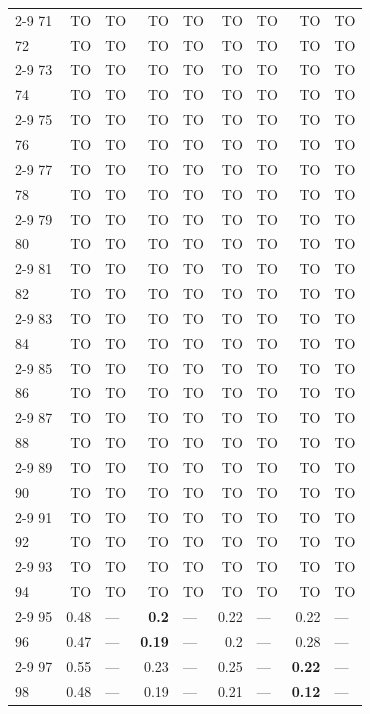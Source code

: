 \begin{longtable}{lr@{\hskip 4pt}l@{\hskip 12pt}r@{\hskip 4pt}l@{\hskip 12pt}r@{\hskip 4pt}l@{\hskip 12pt}r@{\hskip 4pt}l@{\hskip 12pt}}
\cmidrule{2-9}
71 & TO & TO & TO & TO & TO & TO & TO & TO \\
72 & TO & TO & TO & TO & TO & TO & TO & TO \\
\cmidrule{2-9}
73 & TO & TO & TO & TO & TO & TO & TO & TO \\
74 & TO & TO & TO & TO & TO & TO & TO & TO \\
\cmidrule{2-9}
75 & TO & TO & TO & TO & TO & TO & TO & TO \\
76 & TO & TO & TO & TO & TO & TO & TO & TO \\
\cmidrule{2-9}
77 & TO & TO & TO & TO & TO & TO & TO & TO \\
78 & TO & TO & TO & TO & TO & TO & TO & TO \\
\cmidrule{2-9}
79 & TO & TO & TO & TO & TO & TO & TO & TO \\
80 & TO & TO & TO & TO & TO & TO & TO & TO \\
\cmidrule{2-9}
81 & TO & TO & TO & TO & TO & TO & TO & TO \\
82 & TO & TO & TO & TO & TO & TO & TO & TO \\
\cmidrule{2-9}
83 & TO & TO & TO & TO & TO & TO & TO & TO \\
84 & TO & TO & TO & TO & TO & TO & TO & TO \\
\cmidrule{2-9}
85 & TO & TO & TO & TO & TO & TO & TO & TO \\
86 & TO & TO & TO & TO & TO & TO & TO & TO \\
\cmidrule{2-9}
87 & TO & TO & TO & TO & TO & TO & TO & TO \\
88 & TO & TO & TO & TO & TO & TO & TO & TO \\
\cmidrule{2-9}
89 & TO & TO & TO & TO & TO & TO & TO & TO \\
90 & TO & TO & TO & TO & TO & TO & TO & TO \\
\cmidrule{2-9}
91 & TO & TO & TO & TO & TO & TO & TO & TO \\
92 & TO & TO & TO & TO & TO & TO & TO & TO \\
\cmidrule{2-9}
93 & TO & TO & TO & TO & TO & TO & TO & TO \\
94 & TO & TO & TO & TO & TO & TO & TO & TO \\
\cmidrule{2-9}
95 & 0.48 & --- & \textbf{0.2} & --- & 0.22 & --- & 0.22 & --- \\
96 & 0.47 & --- & \textbf{0.19} & --- & 0.2 & --- & 0.28 & --- \\
\cmidrule{2-9}
97 & 0.55 & --- & 0.23 & --- & 0.25 & --- & \textbf{0.22} & --- \\
98 & 0.48 & --- & 0.19 & --- & 0.21 & --- & \textbf{0.12} & --- \\

\end{longtable}
